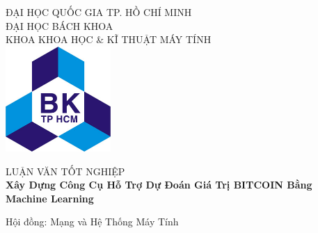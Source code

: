 


\begin{titlepage}

\newcommand{\HRule}{\rule{\linewidth}{0.5mm}} %

\center %
 

\textsc{\Large ĐẠI HỌC QUỐC GIA TP. HỒ CHÍ MINH}\\[0.25cm] %
\textsc{\Large ĐẠI HỌC BÁCH KHOA}\\[0.25cm] %
\textsc{\large KHOA KHOA HỌC \& KĨ THUẬT MÁY TÍNH}\\[0.4cm] %
\vspace{1cm}
\includegraphics[width=0.3\textwidth]{BK.jpg}\\[0.4cm]
\vspace{1cm}

\textsc{\Large{LUẬN VĂN TỐT NGHIỆP}}\\[0.5cm] 

{ \Large \bfseries Xây Dựng Công Cụ Hỗ Trợ Dự Đoán Giá Trị BITCOIN Bằng Machine Learning}\\[0.7cm] %
\begin{flushright}
\vspace{1cm}
\large Hội đồng: Mạng và Hệ Thống Máy Tính
\end{flushright}
 


\end{titlepage}

